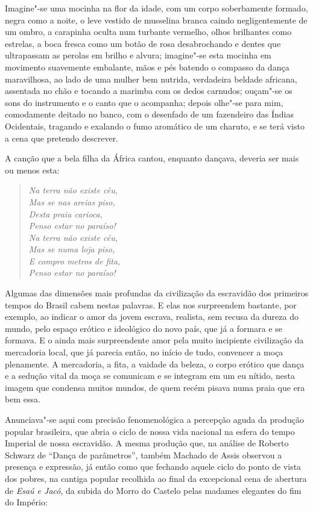 Imagine"-se uma mocinha na flor da idade, com um corpo soberbamente
formado, negra como a noite, o leve vestido de musselina branca caindo
negligentemente de um ombro, a carapinha oculta num turbante vermelho,
olhos brilhantes como estrelas, a boca fresca como um botão de rosa
desabrochando e dentes que ultrapassam as perolas em brilho e alvura;
imagine"-se esta mocinha em movimento suavemente embalante, mãos e pés
batendo o compasso da dança maravilhosa, ao lado de uma mulher bem
nutrida, verdadeira beldade africana, assentada no chão e tocando a
marimba com os dedos carnudos; ouçam"-se os sons do instrumento e o canto
que o acompanha; depois olhe"-se para mim, comodamente deitado no banco,
com o desenfado de um fazendeiro das Índias Ocidentais, tragando e
exalando o fumo aromático de um charuto, e se terá visto a cena que
pretendo descrever.

A canção que a bela filha da África cantou, enquanto dançava, deveria
ser mais ou menos esta:

\begin{verse}
\emph{Na terra não existe céu,\\
Mas se nas areias piso,\\
Desta praia carioca,\\
Penso estar no paraíso!\\[5pt]
Na terra não existe céu,\\
Mas se numa loja piso,\\
E compro metros de fita,\\
Penso estar no paraíso!}
\end{verse}

Algumas das dimensões mais profundas da civilização da escravidão dos
primeiros tempos do Brasil cabem nestas palavras. E elas nos surpreendem
bastante, por exemplo, ao indicar o amor da jovem escrava, realista, sem
recusa da dureza do mundo, pelo espaço erótico e ideológico do novo
país, que já a formara e se formava. E o ainda mais surpreendente amor
pela muito incipiente civilização da mercadoria local, que já parecia
então, no início de tudo, convencer a moça plenamente. A mercadoria, a
fita, a vaidade da beleza, o corpo erótico que dança e a sedução vital
da moça se comunicam e se integram em um eu nítido, nesta imagem que
condensa muitos mundos, de quem recém pisava numa praia que era bem
essa.

Anunciava"-se aqui com precisão fenomenológica a percepção aguda da
produção popular brasileira, que abria o ciclo de nossa vida nacional na
esfera do tempo Imperial de nossa escravidão. A mesma produção que, na
análise de Roberto Schwarz de ``Dança de parâmetros'', também Machado de
Assis observou a presença e expressão, já então como que fechando aquele
ciclo do ponto de vista dos pobres, na cantiga popular recolhida ao
final da excepcional cena de abertura de \emph{Esaú e Jacó}, da subida
do Morro do Castelo pelas madames elegantes do fim do Império:

